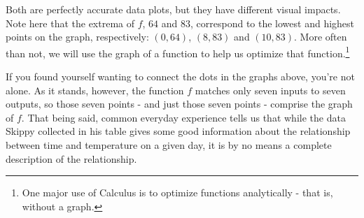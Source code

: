 \documentclass{ximera}
\begin{document}
 
\begin{image}
\end{image}
\begin{center}
\end{center}


Both are perfectly accurate data plots, but they have different visual impacts.    Note here that the extrema of $f$, $64$ and $83$, correspond to the lowest and highest points on the graph, respectively:  $(0, 64)$, $(8, 83)$ and $(10,83)$.  More often than not, we will use the graph of a function to help us optimize that function.\footnote{One major use of Calculus is to optimize functions analytically - that is, without a graph.}

If you found yourself wanting to connect the dots in the graphs above, you're not alone.  As it stands, however, the function $f$ matches only seven inputs to seven outputs, so those seven points - and just those seven points - comprise the graph of $f$.  That being said, common everyday experience tells us that while the data Skippy collected in his table gives some good information about the relationship between time and temperature on a given day, it is by no means a complete description of the relationship.  
\end{document}
